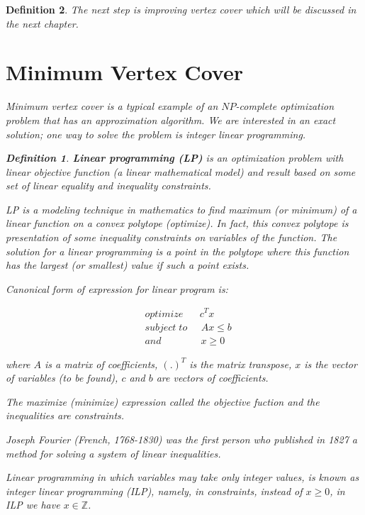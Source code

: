 \documentclass[12pt]{article}
\theoremstyle{slplain}
\newtheorem{defi}{Definition}[section]
\begin{document}
\begin{defi}
The next step is improving vertex cover which will be discussed in the next chapter.






\newpage
\section{Minimum Vertex Cover}{\label{vertex_cover}}
Minimum vertex cover is a typical example of an $NP$-complete optimization problem that has an approximation algorithm. We are interested in an exact solution; one way to solve the problem is integer linear programming.

\begin{defi}
{\bf Linear programming (LP)} is an optimization problem with linear objective function (a linear mathematical model) and result based on some set of linear equality and inequality constraints. 

LP is a modeling technique in mathematics to find maximum (or minimum) of a linear function on a convex polytope (optimize). In fact, this convex polytope is presentation of some inequality constraints on variables of the function. The solution for a linear programming is a point in the polytope where this function has the largest (or smallest) value if such a point exists.

Canonical form of expression for linear program is:

\begin{align*}
&optimize \; \;\; \;\;\; c^Tx\\
&subject\; to \;\;\; \;\; Ax \leq b\\
&and	\qquad\qquad	 x \geq 0
\end{align*}

where $A$ is a matrix of coefficients, $(.)^T$ is the matrix transpose, $x$ is the vector of variables (to be found), $c$ and $b$ are vectors of coefficients.

The maximize (minimize) expression called the objective fuction and the inequalities are constraints.

Joseph Fourier (French, 1768-1830) was the first person who published in 1827 a method for solving a system of linear inequalities. \cite{gerard}

Linear programming in which variables may take only integer values, is known as integer linear programming (ILP), namely, in constraints, instead of $x\geq 0$, in ILP we have $x\in \mathbb{Z}$.
\end{defi}



\end{defi}
\end{document}
